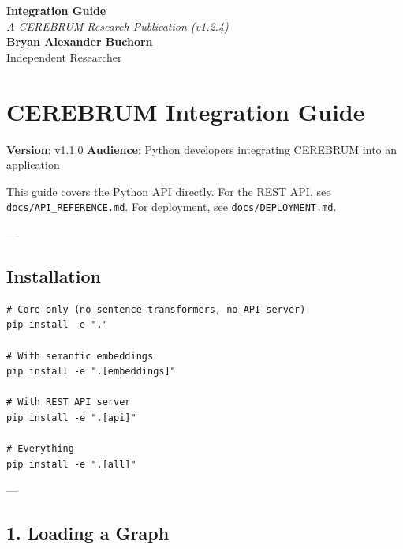 \documentclass[11pt,article,oneside]{memoir}
\begin{document}
\begin{center}
    \Huge \textbf{Integration Guide} \\
    \vspace{0.5em}
    \large \textit{A CEREBRUM Research Publication (v1.2.4)} \\
    \vspace{1em}
    \large \textbf{Bryan Alexander Buchorn} \\
    Independent Researcher \\
    \vspace{2em}
\end{center}

\begin{abstract}
\textbf{Overview:} This guide provides a conceptual entry point into the CEREBRUM framework. It is designed for practitioners and researchers seeking to understand the core reasoning signals of Framework Implementation Guide.
\end{abstract}

\section{CEREBRUM Integration Guide}

\textbf{Version}: v1.1.0
\textbf{Audience}: Python developers integrating CEREBRUM into an application

This guide covers the Python API directly. For the REST API, see \texttt{docs/API\_REFERENCE.md}. For deployment, see \texttt{docs/DEPLOYMENT.md}.

---

\subsection{Instal\-lation}

\begin{lstlisting}
# Core only (no sentence-transformers, no API server)
pip install -e "."

# With semantic embeddings
pip install -e ".[embeddings]"

# With REST API server
pip install -e ".[api]"

# Everything
pip install -e ".[all]"
\end{lstlisting}

---

\subsection{1. Loading a Graph}
\end{document}
